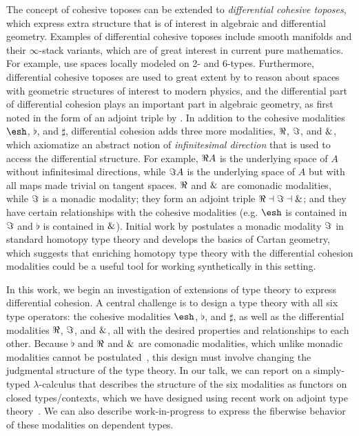 \documentclass{article}
\begin{document}
The concept of cohesive toposes can be extended to \emph{differential
  cohesive toposes}, which express extra structure that is of interest
in algebraic and differential geometry.  Examples of differential
cohesive toposes include smooth manifolds and their $\infty$-stack
variants, which are of great interest in current pure mathematics. For
example, \citet{SatiSchreiberStasheff2012} use spaces locally modeled
on 2- and 6-types.  Furthermore, differential cohesive toposes are used
to great extent by \citet{Schreiber2013} to reason about spaces with
geometric structures of interest to modern physics, and the differential
part of differential cohesion plays an important part in algebraic
geometry, as first noted in the form of an adjoint triple by
\citet{SimpsonTeleman}.  In addition to the cohesive modalities
$\shape$, $\flat$, and $\sharp$, differential cohesion adds three more
modalities, $\Re$, $\Im$, and $\&$, which axiomatize an abstract
notion of \emph{infinitesimal direction} that is used to access the
differential structure.  For example, $\Re A$ is the underlying space
of $A$ without infinitesimal directions, while $\Im A$ is the
underlying space of $A$ but with all maps made trivial on tangent
spaces.  $\Re$ and $\&$ are comonadic modalities, while $\Im$ is a
monadic modality; they form an adjoint triple $\Re \dashv \Im \dashv
\&$; and they have certain relationships with the cohesive modalities
(e.g. $\shape$ is contained in $\Im$ and $\flat$ is contained in
$\&$).  Initial work by \citet{Wellen2017} postulates a monadic
modality $\Im$ in standard homotopy type theory and develops the
basics of Cartan geometry, which suggests that enriching homotopy type
theory with the differential cohesion modalities could be a useful tool
for working synthetically in this setting.
 

In this work, we begin an investigation of extensions of type theory to
express differential cohesion.  A central challenge is to design a type
theory with all six type operators: the cohesive modalities $\shape$,
$\flat$, and $\sharp$, as well as the differential modalities $\Re$,
$\Im$, and $\&$, all with the desired properties and relationships
to each other.  Because $\flat$ and $\Re$ and $\&$ are comonadic
modalities, which unlike monadic modalities cannot be
postulated~\citep{Shulman2015}, this design must involve changing the
judgmental structure of the type theory.  In our talk, we can report on a
simply-typed $\lambda$-calculus that describes the structure of the six
modalities as functors on closed types/contexts, which we have designed
using recent work on adjoint type theory~\citep{Licata2017}.  We can
also describe work-in-progress to express the fiberwise behavior of
these modalities on dependent types.
\end{document}
